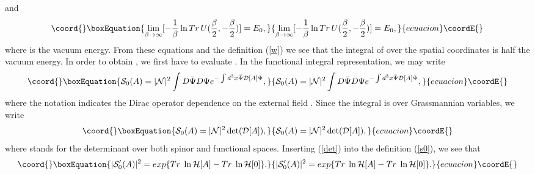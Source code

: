 \documentclass[a4paper,12pt]{article}
\begin{document}
and
\begin{equation}\coord{}\boxEquation{\label{E0euclideo}
\lim_{\beta\to\infty}[-\frac{1}{\beta}\ln Tr\,U(\frac{\beta}{2},-\frac{\beta}{2})]=E_0,
}{\lim_{\beta\to\infty}[-\frac{1}{\beta}\ln Tr\,U(\frac{\beta}{2},-\frac{\beta}{2})]=E_0,
}{ecuacion}\coordE{}\end{equation}
where \coordHE{} is the vacuum energy. From these equations and the
definition (\ref{w}) we see that the integral of \coordHE{} over the
spatial coordinates is half the vacuum energy. In order to obtain
\coordHE{}, we  first have to evaluate \coordHE{}. In the functional
integral representation, we may write
\begin{equation}\coord{}\boxEquation{\label{svacio}
{\mathcal S}_0(A)=|{\mathcal N}|^2 \int D\bar{\Psi} D\Psi e^{-\int d^3x \bar{\Psi} {\mathcal D}[A] \Psi},
}{{\mathcal S}_0(A)=|{\mathcal N}|^2 \int D\bar{\Psi} D\Psi e^{-\int d^3x \bar{\Psi} {\mathcal D}[A] \Psi},
}{ecuacion}\coordE{}\end{equation}
where the notation \coordHE{} indicates the Dirac operator
dependence on the external field \coordHE{}. Since the integral is over
Grassmannian variables, we write
\begin{equation}\coord{}\boxEquation{\label{det}
{\mathcal S}_0(A)=|{\mathcal N}|^2 \det({\mathcal D}[A]),
}{{\mathcal S}_0(A)=|{\mathcal N}|^2 \det({\mathcal D}[A]),
}{ecuacion}\coordE{}\end{equation}
where \myHighlight{$\det$}\coordHE{} stands for the determinant over both spinor and functional
spaces. Inserting (\ref{det}) into the definition (\ref{s0}), we see that
\begin{equation}\coord{}\boxEquation{\label{sdet}
|{\mathcal S}'_0(A)|^2=exp\{Tr\;\ln{\mathcal H}[A]-Tr\;\ln{\mathcal H}[0]\}.
}{|{\mathcal S}'_0(A)|^2=exp\{Tr\;\ln{\mathcal H}[A]-Tr\;\ln{\mathcal H}[0]\}.
}{ecuacion}\coordE{}\end{equation}
\end{document}
